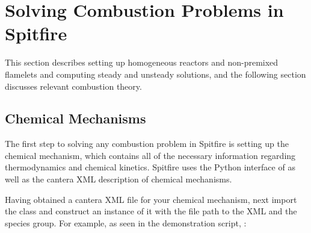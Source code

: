 \documentclass[letterpaper,10pt,english]{sphinxmanual}
\begin{document}
\begin{sphinxVerbatim}[commandchars=\\\{\}]

\end{sphinxVerbatim}


\chapter{Solving Combustion Problems in Spitfire}
\label{\detokenize{combustion:solving-combustion-problems-in-spitfire}}\label{\detokenize{combustion::doc}}
This section describes setting up homogeneous reactors and non-premixed flamelets and computing steady and unsteady solutions,
and the following section discusses relevant combustion theory.


\section{Chemical Mechanisms}
\label{\detokenize{combustion:chemical-mechanisms}}
The first step to solving any combustion problem in Spitfire is setting up the chemical mechanism,
which contains all of the necessary information regarding thermodynamics and chemical kinetics.
Spitfire uses the Python interface of  as well as the cantera XML description of chemical mechanisms.

Having obtained a cantera XML file for your chemical mechanism,
next import the  class and construct an instance of it
with the file path to the XML and the species group.
For example, as seen in the demonstration script, :

\begin{sphinxVerbatim}[commandchars=\\\{\}]
   
   
\end{sphinxVerbatim}
\end{document}
